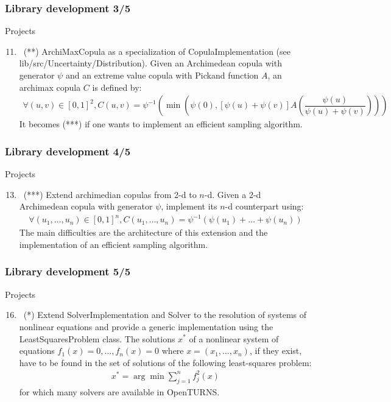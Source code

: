 \documentclass[8pt]{beamer}
\begin{document}
\begin{frame}
  \frametitle{Library development 3/5}
  \begin{block}{Projects}
    \begin{enumerate}
      \setcounter{enumi}{10}
    \item~(**) \alert{\ttfamily ArchiMaxCopula} as a specialization of {\ttfamily CopulaImplementation} (see {\ttfamily lib/src/Uncertainty/Distribution}). Given an Archimedean copula with generator $\psi$ and an extreme value copula with Pickand function $A$, an archimax copula $C$ is defined by:
      \begin{align}
        \forall (u,v)\in[0,1]^2, C(u,v)=\psi^{-1}\left(\min\left(\psi(0), [\psi(u)+\psi(v)]A\left(\dfrac{\psi(u)}{\psi(u)+\psi(v)}\right)\right)\right)
      \end{align}
      It becomes (***) if one wants to implement an efficient sampling algorithm.
    \end{enumerate}
  \end{block}
\end{frame}

\begin{frame}
  \frametitle{Library development 4/5}
  \begin{block}{Projects}
    \begin{enumerate}
      \setcounter{enumi}{12}
    \item~(***) Extend archimedian copulas from 2-d to $n$-d. Given a 2-d Archimedean copula with generator $\psi$, implement its $n$-d counterpart using:
      \begin{align}
        \forall (u_1,\dots,u_n)\in[0,1]^n, C(u_1,\dots,u_n)=\psi^{-1}\left(\psi(u_1)+\dots+\psi(u_n)\right)
      \end{align}
      The main difficulties are the architecture of this extension and the implementation of an efficient sampling algorithm.
    \end{enumerate}
  \end{block}
\end{frame}

\begin{frame}
  \frametitle{Library development 5/5}
  \begin{block}{Projects}
    \begin{enumerate}
      \setcounter{enumi}{15}
    \item~(*) Extend \alert{\ttfamily SolverImplementation} and \alert{\ttfamily Solver} to the resolution of systems of nonlinear equations and provide a generic implementation using the \alert{\ttfamily LeastSquaresProblem} class. The solutions $x^*$ of a nonlinear system of equations $f_1(x)=0,\dots,f_n(x)=0$ where $x=(x_1,\dots,x_n)$, if they exist, have to be found in the set of solutions of the following least-squares problem:
      \begin{align}
        x^*=\arg\min \sum_{j=1}^n f_j^2(x)
      \end{align}
      for which many solvers are available in OpenTURNS.
    \end{enumerate}
  \end{block}
\end{frame}
\end{document}
